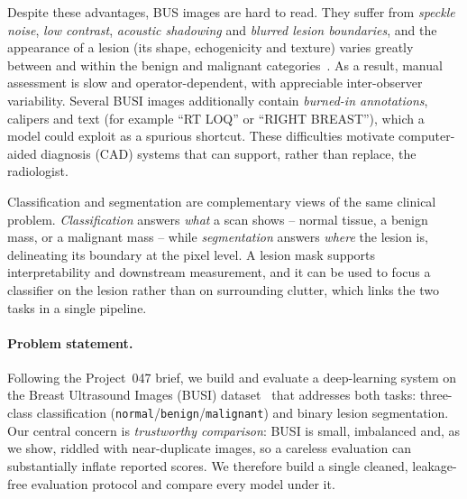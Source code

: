 \documentclass[11pt]{article}
\begin{document}
Despite these advantages, BUS images are hard to read. They suffer from
\emph{speckle noise}, \emph{low contrast}, \emph{acoustic shadowing} and
\emph{blurred lesion boundaries}, and the appearance of a lesion (its shape,
echogenicity and texture) varies greatly between and within the benign and
malignant categories~\cite{xian2018survey,aldhabyani2020busi}. As a result,
manual assessment is slow and operator-dependent, with appreciable
inter-observer variability. Several BUSI images additionally contain
\emph{burned-in annotations}, calipers and text (for example ``RT LOQ'' or
``RIGHT BREAST''), which a model could exploit as a spurious shortcut. These
difficulties motivate computer-aided diagnosis (CAD) systems that can support,
rather than replace, the radiologist.

Classification and segmentation are complementary views of the same clinical
problem. \emph{Classification} answers \emph{what} a scan shows -- normal tissue,
a benign mass, or a malignant mass -- while \emph{segmentation} answers
\emph{where} the lesion is, delineating its boundary at the pixel level. A
lesion mask supports interpretability and downstream measurement, and it can be
used to focus a classifier on the lesion rather than on surrounding clutter,
which links the two tasks in a single pipeline.

\paragraph{Problem statement.}
Following the Project~047 brief, we build and evaluate a deep-learning system on
the Breast Ultrasound Images (BUSI) dataset~\cite{aldhabyani2020busi} that
addresses both tasks: three-class classification
(\texttt{normal}/\texttt{benign}/\texttt{malignant}) and binary lesion
segmentation. Our central concern is \emph{trustworthy comparison}: BUSI is
small, imbalanced and, as we show, riddled with near-duplicate images, so a
careless evaluation can substantially inflate reported scores. We therefore
build a single cleaned, leakage-free evaluation protocol and compare every model
under it.
\end{document}
